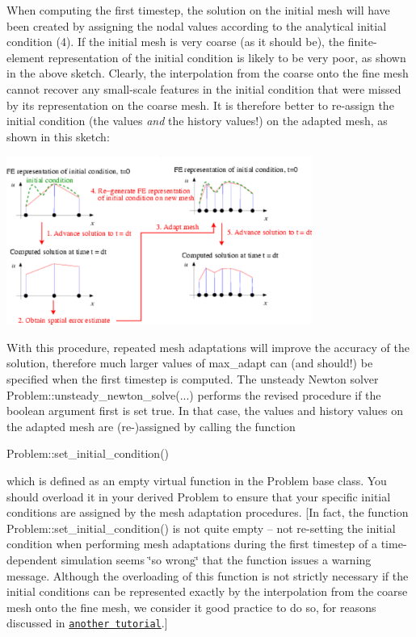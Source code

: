 \begin{DoxyEnumerate}
\begin{DoxyImage}
\end{DoxyImage}
 When computing the first timestep, the solution on the initial mesh will have been created by assigning the nodal values according to the analytical initial condition (4). If the initial mesh is very coarse (as it should be), the finite-\/element representation of the initial condition is likely to be very poor, as shown in the above sketch. Clearly, the interpolation from the coarse onto the fine mesh cannot recover any small-\/scale features in the initial condition that were missed by its representation on the coarse mesh. It is therefore better to re-\/assign the initial condition (the values {\itshape and} the history values!) on the adapted mesh, as shown in this sketch\+:  
\begin{DoxyImage}
\includegraphics[width=0.75\textwidth]{adapted_ic2}
\end{DoxyImage}
 With this procedure, repeated mesh adaptations will improve the accuracy of the solution, therefore much larger values of {\ttfamily max\+\_\+adapt} can (and should!) be specified when the first timestep is computed. The unsteady Newton solver {\ttfamily Problem\+::unsteady\+\_\+newton\+\_\+solve}(...) performs the revised procedure if the boolean argument {\ttfamily first} is set {\ttfamily true}. In that case, the values and history values on the adapted mesh are (re-\/)assigned by calling the function 
\begin{DoxyCode}
Problem::set\_initial\_condition()
\end{DoxyCode}
 which is defined as an empty virtual function in the {\ttfamily Problem} base class. You should overload it in your derived {\ttfamily Problem} to ensure that your specific initial conditions are assigned by the mesh adaptation procedures. \mbox{[}In fact, the function {\ttfamily Problem\+::set\+\_\+initial\+\_\+condition()} is not quite empty -- not re-\/setting the initial condition when performing mesh adaptations during the first timestep of a time-\/dependent simulation seems \char`\"{}so 
   wrong\char`\"{} that the function issues a warning message. Although the overloading of this function is not strictly necessary if the initial conditions can be represented exactly by the interpolation from the coarse mesh onto the fine mesh, we consider it good practice to do so, for reasons discussed in \href{../../../axisym_navier_stokes/spin_up/html/index.html#good_practice_ics}{\tt another tutorial}.\mbox{]}
\end{DoxyEnumerate}
